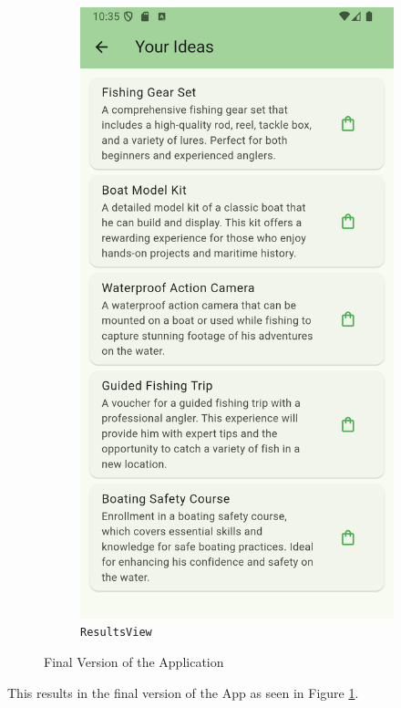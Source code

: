 \begin{figure}
\begin{subfigure}{0.5\textwidth}
		\includegraphics[width=0.9\linewidth]{figures/screenshots/new_results_view_cropped.png}
		\caption{\texttt{ResultsView}}
	\end{subfigure}
	\caption{Final Version of the Application}
	\label{fig:finalVersion}
\end{figure}

This results in the final version of the App as seen in Figure \ref{fig:finalVersion}.
